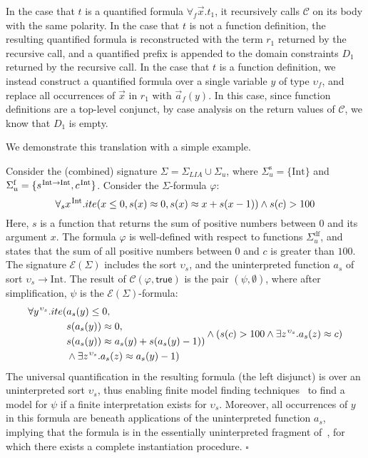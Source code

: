 \documentclass[runningheads,a4paper]{llncs}
\newcommand{\con}[1]{\mathsf{#1}}
\newcommand{\teq}{\approx}
\newcommand{\conv}{\mathcal{C}}
\newcommand{\ssorts}[1]{#1^\mathrm{s}}
\newcommand{\sfuns}[1]{#1^\mathrm{f}}
\newcommand{\sfundefs}[1]{#1^\mathrm{df}}
\newcommand{\sortint}{\mathrm{Int}}
\newcommand{\ptrue}{\con{true}}
\newcommand{\forallf}[1]{\forall_{#1}}
\newcommand{\farg}[1]{a_{#1}}
\newcommand{\vecfarg}[1]{\vec{a}_{#1}}
\newcommand{\fargsort}[1]{\upsilon_{#1}}
\newcommand{\Sigmalia}{\Sigma_{LIA}}
\newcommand{\extendsig}[1]{\mathcal{E}( #1 )}
\newcommand{\vthinspace}{\kern+0.083333em}
\newcommand{\typ}[1]{^{\vthinspace #1}}
\begin{document}
In the case that $t$ is a quantified formula $\forallf{f} \vec x. t_1$, it recursively calls $\conv$ on its body with the same polarity.
In the case that $t$ is not a function definition, 
the resulting quantified formula is reconstructed with the term $r_1$ returned by the recursive call,
and a quantified prefix is appended to the domain constraints $D_1$ returned by the recursive call.
In the case that $t$ is a function definition,
we instead construct a quantified formula over a single variable $y$ of type $\fargsort{f}$,
and replace all occurrences of $\vec x$ in $r_1$ with $\vecfarg{f}( y )$.
In this case, since function definitions are a top-level conjunct, by case analysis on the return values of $\conv$, we know that $D_1$ is empty.



We demonstrate this translation with a simple example.

\begin{example}
Consider the (combined) signature $\Sigma = \Sigmalia \cup \Sigma_u$,
where $\ssorts{\Sigma_u} = \{ \sortint \}$ and 
$\sfuns{\Sigma_u} = \{ s\typ{ \sortint \rightarrow \sortint }, c\typ{ \sortint } \}$.
Consider the $\Sigma$-formula $\varphi$:
\begin{equation*}
\forall_{s} x\typ{\sortint}. ite( x \leq 0, s(x) \teq 0, s( x ) \teq x + s( x-1 ) ) \wedge s( c ) > 100
\end{equation*}
Here, $s$ is a function that returns the sum of positive numbers between $0$ and its argument $x$.
The formula $\varphi$ is well-defined with respect to functions $\sfundefs{\Sigma_u}$,
and states that the sum of all positive numbers between $0$ and $c$ is greater than $100$.
The signature $\extendsig{\Sigma}$ includes the sort $\fargsort{s}$,
and the uninterpreted function $\farg{s}$ of sort $\fargsort{s} \rightarrow \sortint$.
The result of $\conv( \varphi, \ptrue )$ is the pair $( \psi, \emptyset )$, where after simplification, $\psi$ is the $\extendsig{\Sigma}$-formula:
\begin{equation*}
\begin{split}
\forall y\typ{\fargsort{s}}. ite( & \farg{s}( y ) \leq 0,  \\
 & s(\farg{s}( y )) \teq 0, \\
 & s(\farg{s}( y )) \teq \farg{s}( y ) + s( \farg{s}( y )-1 ) ) \\
 & \wedge \exists z\typ{\fargsort{s}}. \farg{s}( z ) \teq \farg{s}( y )-1 )
\end{split}  
\wedge ( s( c ) > 100 \wedge \exists z\typ{\fargsort{s}}. \farg{s}( z ) \teq c )
\end{equation*}
The universal quantification in the resulting formula (the left disjunct) is over an uninterpreted sort $\fargsort{s}$, 
thus enabling finite model finding techniques~\cite{ReyEtAl-1-RR-13} to find a model for $\psi$ if a finite interpretation exists for $\fargsort{s}$.
Moreover, all occurrences of $y$ in this formula are beneath applications of the uninterpreted function $\farg{s}$,
implying that the formula is in the essentially uninterpreted fragment of~\cite{GeDeM-CAV-09}, for which there exists a complete instantiation procedure.
$\square$
\end{example}
\end{document}

